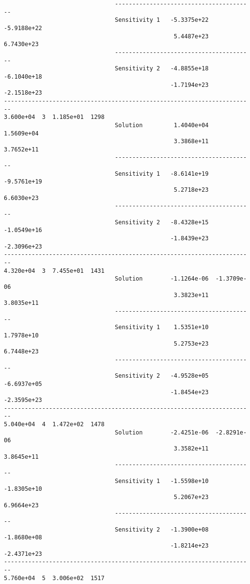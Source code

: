 \begin{verbatim}
                                ----------------------------------------
                                Sensitivity 1   -5.3375e+22  -5.9188e+22 
                                                 5.4487e+23   6.7430e+23 
                                ----------------------------------------
                                Sensitivity 2   -4.8855e+18  -6.1040e+18 
                                                -1.7194e+23  -2.1518e+23 
------------------------------------------------------------------------
3.600e+04  3  1.185e+01  1298
                                Solution         1.4040e+04   1.5609e+04 
                                                 3.3868e+11   3.7652e+11 
                                ----------------------------------------
                                Sensitivity 1   -8.6141e+19  -9.5761e+19 
                                                 5.2718e+23   6.6030e+23 
                                ----------------------------------------
                                Sensitivity 2   -8.4328e+15  -1.0549e+16 
                                                -1.8439e+23  -2.3096e+23 
------------------------------------------------------------------------
4.320e+04  3  7.455e+01  1431
                                Solution        -1.1264e-06  -1.3709e-06 
                                                 3.3823e+11   3.8035e+11 
                                ----------------------------------------
                                Sensitivity 1    1.5351e+10   1.7978e+10 
                                                 5.2753e+23   6.7448e+23 
                                ----------------------------------------
                                Sensitivity 2   -4.9528e+05  -6.6937e+05 
                                                -1.8454e+23  -2.3595e+23 
------------------------------------------------------------------------
5.040e+04  4  1.472e+02  1478
                                Solution        -2.4251e-06  -2.8291e-06 
                                                 3.3582e+11   3.8645e+11 
                                ----------------------------------------
                                Sensitivity 1   -1.5598e+10  -1.8305e+10 
                                                 5.2067e+23   6.9664e+23 
                                ----------------------------------------
                                Sensitivity 2   -1.3900e+08  -1.8680e+08 
                                                -1.8214e+23  -2.4371e+23 
------------------------------------------------------------------------
5.760e+04  5  3.006e+02  1517

\end{verbatim}
